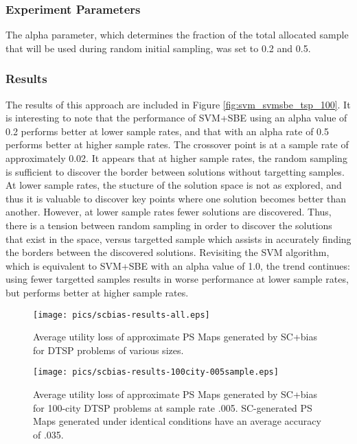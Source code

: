 \subsubsection{Experiment Parameters} 

The alpha parameter, which determines the fraction of the total allocated sample that will be used during random initial sampling, was set to 0.2 and 0.5.

\subsubsection{Results} The results of this approach are included in Figure \ref{fig:svm_svmsbe_tsp_100}.  It is interesting to note that the performance of SVM+SBE using an alpha value of 0.2 performs better at lower sample rates, and that with an alpha rate of 0.5 performs better at higher sample rates.  The crossover point is at a sample rate of approximately 0.02.  It appears that at higher sample rates, the random sampling is sufficient to discover the border between solutions without targetting samples.  At lower sample rates, the stucture of the solution space is not as explored, and thus it is valuable to discover key points where one solution becomes better than another.  However, at lower sample rates fewer solutions are discovered.  Thus, there is a tension between random sampling in order to discover the solutions that exist in the space, versus targetted sample which assists in accurately finding the borders between the discovered solutions.  Revisiting the SVM algorithm, which is equivalent to SVM+SBE with an alpha value of 1.0, the trend continues:  using fewer targetted samples results in worse performance at lower sample rates, but performs better at higher sample rates.




\begin{figure}
\begin{center}
\texttt{[image: pics/scbias-results-all.eps]}
\caption{Average utility loss of approximate PS Maps generated by SC+bias for DTSP problems of various sizes.}
\label{fig:scbias-results-all}
\end{center}
\end{figure}

\begin{figure}
\begin{center}
\texttt{[image: pics/scbias-results-100city-005sample.eps]}
\caption{Average utility loss of approximate PS Maps generated by SC+bias for 100-city DTSP problems at sample rate .005.  SC-generated PS Maps generated under identical conditions have an average accuracy of .035.}
\label{fig:scbias-results-100city-005sample}
\end{center}
\end{figure}


